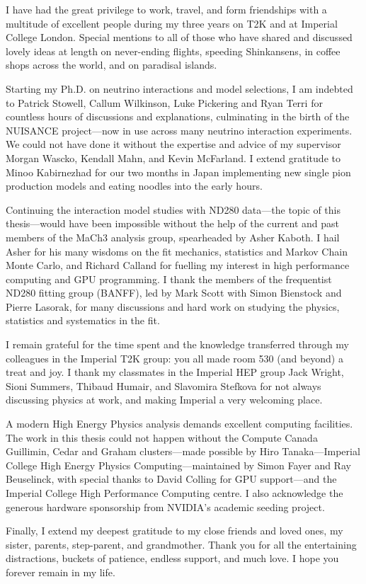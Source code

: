 \begin{acknowledgements}
	I have had the great privilege to work, travel, and form friendships with a multitude of excellent people during my three years on T2K and at Imperial College London. Special mentions to all of those who have shared and discussed lovely ideas at length on never-ending flights, speeding Shinkansens, in coffee shops across the world, and on paradisal islands.
	
	Starting my Ph.D. on neutrino interactions and model selections, I am indebted to Patrick Stowell, Callum Wilkinson, Luke Pickering and Ryan Terri for countless hours of discussions and explanations, culminating in the birth of the NUISANCE project\cite{NUISANCE}---now in use across many neutrino interaction experiments. We could not have done it without the expertise and advice of my supervisor Morgan Wascko, Kendall Mahn, and Kevin McFarland. I extend gratitude to Minoo Kabirnezhad for our two months in Japan implementing new single pion production models and eating noodles into the early hours.
  
	Continuing the interaction model studies with ND280 data---the topic of this thesis---would have been impossible without the help of the current and past members of the MaCh3 analysis group, spearheaded by Asher Kaboth. I hail Asher for his many wisdoms on the fit mechanics, statistics and Markov Chain Monte Carlo, and Richard Calland for fuelling my interest in high performance computing and GPU programming. I thank the members of the frequentist ND280 fitting group (BANFF), led by Mark Scott with Simon Bienstock and Pierre Lasorak, for many discussions and hard work on studying the physics, statistics and systematics in the fit.
	
	I remain grateful for the time spent and the knowledge transferred through my colleagues in the Imperial T2K group: you all made room 530 (and beyond) a treat and joy. I thank my classmates in the Imperial HEP group Jack Wright, Sioni Summers, Thibaud Humair, and Slavomira Stefkova for not always discussing physics at work, and making Imperial a very welcoming place.
	
	A modern High Energy Physics analysis demands excellent computing facilities. The work in this thesis could not happen without the Compute Canada Guillimin, Cedar and Graham clusters---made possible by Hiro Tanaka---Imperial College High Energy Physics Computing---maintained by Simon Fayer and Ray Beuselinck, with special thanks to David Colling for GPU support---and the Imperial College High Performance Computing centre. I also acknowledge the generous hardware sponsorship from NVIDIA's academic seeding project.
	
	Finally, I extend my deepest gratitude to my close friends and loved ones, my sister, parents, step-parent, and grandmother. Thank you for all the entertaining distractions, buckets of patience, endless support, and much love. I hope you forever remain in my life.
\end{acknowledgements}

\tableofcontents